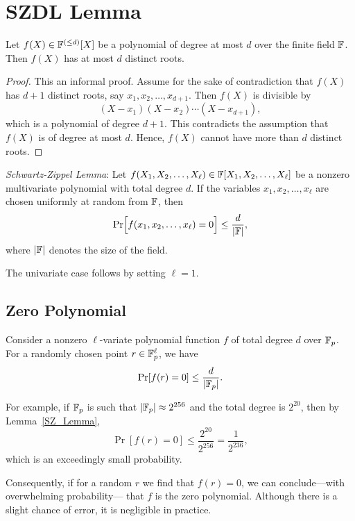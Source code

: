 \section{SZDL Lemma}

\begin{theorem}
    Let $f(X) \in \mathbb{F}^{(\leq d)}[X]$ be a polynomial of degree at most $d$ over the finite field $\mathbb{F}$. Then $f(X)$ has at most $d$ distinct roots.
\end{theorem}

\begin{proof}
    This an informal proof. Assume for the sake of contradiction that $f(X)$ has $d+1$ distinct roots, say $x_1, x_2, \ldots, x_{d+1}$. 
    Then $f(X)$ is divisible by
    \[
        (X - x_1)(X - x_2) \cdots (X - x_{d+1}),
    \]
    which is a polynomial of degree $d+1$. This contradicts the assumption that $f(X)$ is of degree at most $d$. Hence, $f(X)$ cannot have more than $d$ distinct roots.
\end{proof}

\begin{lemma} \label{SZ_Lemma}
    \textit{Schwartz-Zippel Lemma}: Let $f(X_1, X_2, \ldots, X_{\ell}) \in \mathbb{F}[X_1, X_2, \ldots, X_{\ell}]$ be a nonzero multivariate polynomial with total degree $d$. 
    If the variables $x_1, x_2, \ldots, x_{\ell}$ are chosen uniformly at random from $\mathbb{F}$, then
    \[
        \Pr\Bigl[f(x_1, x_2, \ldots, x_{\ell}) = 0\Bigr] \le \frac{d}{|\mathbb{F}|},
    \]
    where $|\mathbb{F}|$ denotes the size of the field.
\end{lemma}
The univariate case follows by setting $\ell = 1$.

\subsection{Zero Polynomial}
Consider a nonzero $\ell$-variate polynomial function $f$ of total degree $d$ over $\mathbb{F}_p$. 
For a randomly chosen point $r \in \mathbb{F}_p^{\ell}$, we have
\[
    \Pr[f(r) = 0] \le \frac{d}{|\mathbb{F}_p|}.
\]

For example, if $\mathbb{F}_p$ is such that $|\mathbb{F}_p| \approx 2^{256}$ and the total degree is $2^{20}$, then by Lemma~\ref{SZ_Lemma},
\[
    \Pr[f(r) = 0] \le \frac{2^{20}}{2^{256}} = \frac{1}{2^{236}},
\]
which is an exceedingly small probability.

Consequently, if for a random $r$ we find that $f(r)=0$, we can conclude—with overwhelming probability—
that $f$ is the zero polynomial. Although there is a slight chance of error, it is negligible in practice.

